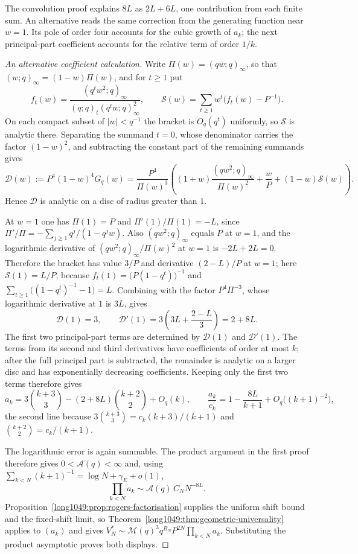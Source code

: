 \documentclass[11pt]{article}
\begin{document}
The convolution proof explains $8L$ as $2L+6L$, one contribution
from each finite sum. An alternative reads the same correction from
the generating function near $w=1$. Its pole of order four accounts
for the cubic growth of $a_k$; the next principal-part coefficient
accounts for the relative term of order $1/k$.
\begin{proof}[An alternative coefficient calculation]
Write $\Pi(w)=(qw;q)_\infty$, so that $(w;q)_\infty=(1-w)\Pi(w)$, and for
$t\ge1$ put
\[
 f_t(w)=\frac{(q^tw^2;q)_\infty}{(q;q)_t(q^tw;q)_\infty^2},
 \qquad
 \mathcal S(w)=\sum_{t\ge1}w^t\bigl(f_t(w)-P^{-1}\bigr).
\]
On each compact subset of $|w|<q^{-1}$ the bracket is $O_q(q^t)$ uniformly, so
$\mathcal S$ is analytic there. Separating the summand $t=0$, whose
denominator carries the factor $(1-w)^2$, and subtracting the constant part of
the remaining summands gives
\[
 \mathcal D(w):=P^4(1-w)^4G_q(w)
 =\frac{P^4}{\Pi(w)^3}
 \left((1+w)\frac{(qw^2;q)_\infty}{\Pi(w)^2}+\frac wP
       +(1-w)\mathcal S(w)\right).
\]
Hence $\mathcal D$ is analytic on a disc of radius greater than $1$.

At $w=1$ one has $\Pi(1)=P$ and $\Pi'(1)/\Pi(1)=-L$, since
$\Pi'/\Pi=-\sum_{j\ge1}q^j/(1-q^jw)$. Also $(qw^2;q)_\infty$ equals $P$ at
$w=1$, and the logarithmic derivative of $(qw^2;q)_\infty/\Pi(w)^2$ at $w=1$ is
$-2L+2L=0$. Therefore the bracket has value $3/P$ and derivative $(2-L)/P$
at $w=1$; here $\mathcal S(1)=L/P$, because
$f_t(1)=\bigl(P(1-q^t)\bigr)^{-1}$ and
$\sum_{t\ge1}\bigl((1-q^t)^{-1}-1\bigr)=L$. Combining with the factor
$P^4\Pi^{-3}$, whose logarithmic derivative at $1$ is $3L$, gives
\[
 \mathcal D(1)=3,\qquad
 \mathcal D'(1)=3\left(3L+\frac{2-L}3\right)=2+8L.
\]
The first two principal-part terms are determined by $\mathcal D(1)$
and $\mathcal D'(1)$. The terms from its second and third derivatives
have coefficients of order at most $k$; after the full principal part
is subtracted, the remainder is analytic on a larger disc and has
exponentially decreasing coefficients. Keeping only the first two
terms therefore gives
\[
 a_k=3\binom{k+3}3-(2+8L)\binom{k+2}2+O_q(k),
 \qquad
 \frac{a_k}{c_k}=1-\frac{8L}{k+1}+O_q\bigl((k+1)^{-2}\bigr),
\]
the second line because $3\binom{k+3}3=c_k(k+3)/(k+1)$ and
$\binom{k+2}2=c_k/(k+1)$.

The logarithmic error is again summable. The product argument in
the first proof therefore gives $0<\mathcal A(q)<\infty$ and,
using $\sum_{k<N}(k+1)^{-1}=\log N+\gamma_{\!E}+o(1)$,
\[
 \prod_{k<N}a_k\sim\mathcal A(q)\,C_NN^{-8L}.
\]
Proposition~\ref{long1049:prop:rogers-factorisation} supplies the uniform shift
bound and the fixed-shift limit, so
Theorem~\ref{long1049:thm:geometric-universality} applies to $(a_k)$ and gives
$V_N^*\sim\mathcal M(q)^3q^{B_N}P^{2N}\prod_{k<N}a_k$. Substituting the product
asymptotic proves both displays.

\end{proof}
\end{document}
